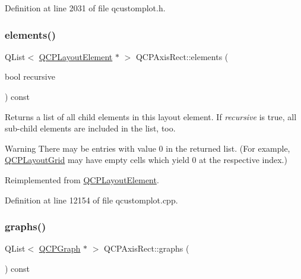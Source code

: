 Definition at line 2031 of file qcustomplot.\+h.

\mbox{\label{class_q_c_p_axis_rect_a40c0b3b17eb317ff4d393b7cb9b082a2}} 
\subsubsection{\texorpdfstring{elements()}{elements()}}
{\footnotesize\ttfamily Q\+List$<$ \hyperlink{class_q_c_p_layout_element}{Q\+C\+P\+Layout\+Element} $\ast$ $>$ Q\+C\+P\+Axis\+Rect\+::elements (\begin{DoxyParamCaption}\item[{bool}]{recursive }\end{DoxyParamCaption}) const\hspace{0.3cm}{\ttfamily [virtual]}}

Returns a list of all child elements in this layout element. If {\itshape recursive} is true, all sub-\/child elements are included in the list, too.

\begin{DoxyWarning}{Warning}
There may be entries with value 0 in the returned list. (For example, \hyperlink{class_q_c_p_layout_grid}{Q\+C\+P\+Layout\+Grid} may have empty cells which yield 0 at the respective index.) 
\end{DoxyWarning}


Reimplemented from \hyperlink{class_q_c_p_layout_element_a76dec8cb31e498994a944d7647a43309}{Q\+C\+P\+Layout\+Element}.



Definition at line 12154 of file qcustomplot.\+cpp.

\mbox{\label{class_q_c_p_axis_rect_a2d9ded3eca97be1fcb5867949391bb88}} 
\subsubsection{\texorpdfstring{graphs()}{graphs()}}
{\footnotesize\ttfamily Q\+List$<$ \hyperlink{class_q_c_p_graph}{Q\+C\+P\+Graph} $\ast$ $>$ Q\+C\+P\+Axis\+Rect\+::graphs (\begin{DoxyParamCaption}{ }\end{DoxyParamCaption}) const}

